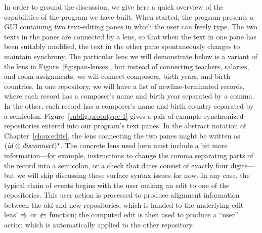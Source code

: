 In order to ground the discussion, we give here a quick overview of the
capabilities of the program we have built. When started, the program
presents a GUI containing two text-editing panes in which the user can
freely type. The two texts in the panes are connected by a lens, so that
when the text in one pane has been suitably modified, the text in the other
pane spontaneously changes to maintain synchrony. The particular lens we
will demonstrate below is a variant of the lens in
Figure~\ref{fig:span-lenses}, but instead of connecting teachers, salaries,
and room assignments, we will connect composers, birth years, and birth
countries. In one repository, we will have a list of newline-terminated
records, where each record has a composer's name and birth year separated by
a comma. In the other, each record has a composer's name and birth country
separated by a semicolon. Figure~\ref{subfig:prototype-1} gives a pair of
example synchronized repositories entered into our program's text panes. In
the abstract notation of Chapter~\ref{chap:edits}, the lens connecting the
two panes might be written as $(\mathit{id}\otimes\mathit{disconnect})^\star$. The concrete
lens used here must include a bit more information---for example,
instructions to change the comma separating parts of the record into a
semicolon, or a check that dates consist of exactly four digits---but we
will skip discussing these surface syntax issues for now. In any case, the
typical chain of events begins with the user making an edit to one of the
repositories. This user action is processed to produce alignment information
between the old and new repositories, which is handed to the underlying edit
lens' $\mathord{\Rrightarrow}$ or $\mathord{\Lleftarrow}$ function; the computed edit is then used to
produce a ``user'' action which is automatically applied to the other
repository.

